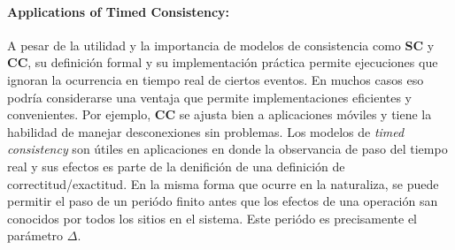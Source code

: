 \paragraph{\textnormal{\textbf{Applications of Timed Consistency:}}}
A pesar de la utilidad y la importancia de modelos de consistencia como \textbf{SC} y \textbf{CC}, su definición formal y su implementación práctica permite ejecuciones que ignoran la ocurrencia en tiempo real de ciertos eventos. En muchos casos eso podría considerarse una ventaja que permite implementaciones eficientes y convenientes. Por ejemplo, \textbf{CC} se ajusta bien a aplicaciones móviles y tiene la habilidad de manejar desconexiones sin problemas. Los modelos de \emph{timed consistency} son útiles en aplicaciones en donde la observancia de paso del tiempo real y sus efectos es parte de la denifición de una definición de correctitud/exactitud. En la misma forma que ocurre en la naturaliza, se puede permitir el paso de un periódo finito antes que los efectos de una operación san conocidos por todos los sitios en el sistema. Este periódo es precisamente el parámetro $\Delta$.

